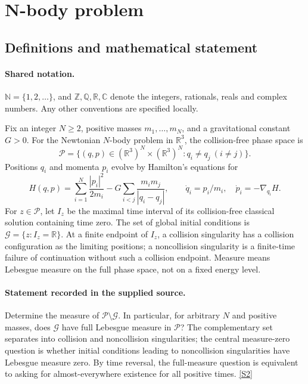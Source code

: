 \documentclass[11pt]{article}
\newcommand{\sref}[2]{\hyperlink{source:#1:#2}{[S#2]}}
\begin{document}
\section{N-body problem}\label{statement}

\subsection{Definitions and mathematical statement}

\paragraph{Shared notation.}$\mathbb N=\{1,2,\ldots\}$, and $\mathbb Z,\mathbb Q,\mathbb R,\mathbb C$ denote the integers, rationals, reals and complex numbers. Any other conventions are specified locally.


Fix an integer \(N\ge2\), positive masses \(m_1,\ldots,m_N\), and a gravitational constant \(G>0\). For the Newtonian \(N\)-body problem in \(\mathbb R^3\), the collision-free phase space is
\[\mathcal P=\{(q,p)\in(\mathbb R^3)^N\times(\mathbb R^3)^N:q_i\ne q_j\ (i\ne j)\}.\]
Positions \(q_i\) and momenta \(p_i\) evolve by Hamilton's equations for
\[H(q,p)=\sum_{i=1}^N\frac{|p_i|^2}{2m_i}
-G\sum_{i<j}\frac{m_i m_j}{|q_i-q_j|},\qquad
\dot q_i=p_i/m_i,\quad \dot p_i=-\nabla_{q_i}H.\]
For \(z\in\mathcal P\), let \(I_z\) be the maximal time interval of its collision-free classical solution containing time zero. The set of global initial conditions is \(\mathcal G=\{z:I_z=\mathbb R\}\). At a finite endpoint of \(I_z\), a collision singularity has a collision configuration as the limiting positions; a noncollision singularity is a finite-time failure of continuation without such a collision endpoint. Measure means Lebesgue measure on the full phase space, not on a fixed energy level.
\paragraph{Statement recorded in the supplied source.}
Determine the measure of \(\mathcal P\setminus\mathcal G\). In particular, for arbitrary \(N\) and positive masses, does \(\mathcal G\) have full Lebesgue measure in \(\mathcal P\)? The complementary set separates into collision and noncollision singularities; the central measure-zero question is whether initial conditions leading to noncollision singularities have Lebesgue measure zero. By time reversal, the full-measure question is equivalent to asking for almost-everywhere existence for all positive times. \sref{statement}{2}
\end{document}
